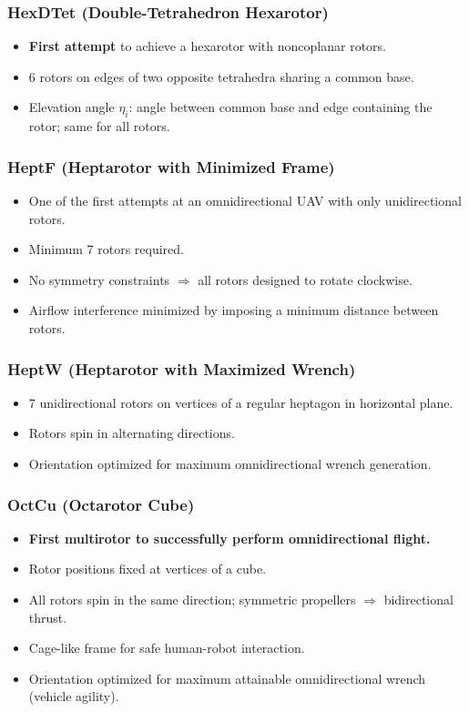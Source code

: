 \documentclass[11pt,a4paper]{article}
\begin{document}
\subsubsection*{HexDTet (Double-Tetrahedron Hexarotor)}
\begin{itemize}
  \item \textbf{First attempt} to achieve a hexarotor with noncoplanar rotors.
  \item 6 rotors on edges of two opposite tetrahedra sharing a common base.
  \item Elevation angle $\eta_i$: angle between common base and edge containing the rotor; same for all rotors.
\end{itemize}

\subsubsection*{HeptF (Heptarotor with Minimized Frame)}
\begin{itemize}
  \item One of the first attempts at an omnidirectional UAV with only unidirectional rotors.
  \item Minimum 7 rotors required.
  \item No symmetry constraints $\Rightarrow$ all rotors designed to rotate clockwise.
  \item Airflow interference minimized by imposing a minimum distance between rotors.
\end{itemize}

\subsubsection*{HeptW (Heptarotor with Maximized Wrench)}
\begin{itemize}
  \item 7 unidirectional rotors on vertices of a regular heptagon in horizontal plane.
  \item Rotors spin in alternating directions.
  \item Orientation optimized for maximum omnidirectional wrench generation.
\end{itemize}

\subsubsection*{OctCu (Octarotor Cube)}
\begin{itemize}
  \item \textbf{First multirotor to successfully perform omnidirectional flight.}
  \item Rotor positions fixed at vertices of a cube.
  \item All rotors spin in the same direction; symmetric propellers $\Rightarrow$ bidirectional thrust.
  \item Cage-like frame for safe human-robot interaction.
  \item Orientation optimized for maximum attainable omnidirectional wrench (vehicle agility).
\end{itemize}
\end{document}
